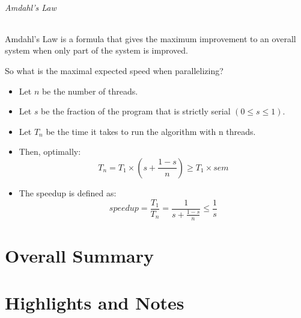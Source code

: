 \documentclass[openany,12pt]{book}
\begin{document}
\paragraph{Amdahl's Law} Amdahl's Law is a formula that gives the maximum improvement to an overall system when only part of the system is improved.\par
So what is the maximal expected speed when parallelizing?
\begin{itemize}
    \item Let \(n\) be the number of threads.
    \item Let \(s\) be the fraction of the program that is strictly serial \((0\leq s \leq 1)\).
    \item Let \(T_n\) be the time it takes to run the algorithm with n threads.
    \item Then, optimally:
          \begin{equation*}
              T_n = T_1 \times \left( s + \frac{1-s}{n} \right) \geq T_1 \times sem
          \end{equation*}
    \item The speedup is defined as:
          \begin{equation*}
              speedup = \frac{T_1}{T_n} = \frac{1}{s + \frac{1-s}{n}} \leq \frac{1}{s}
          \end{equation*}
\end{itemize}



\newpage
\part{Overall Summary}
















\newpage
\part{Highlights and Notes}
\end{document}
